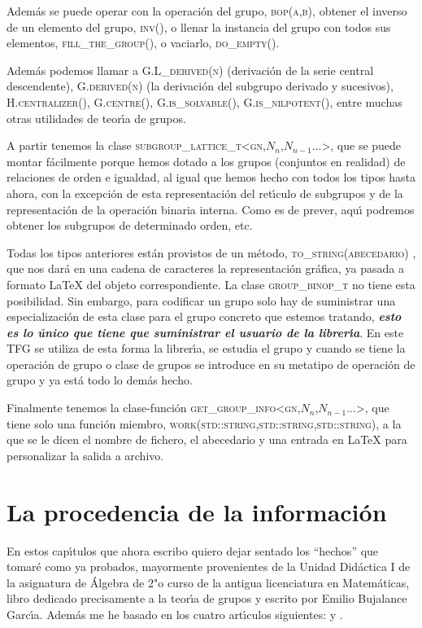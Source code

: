 \documentclass[final,12pt,a4paper,twoside,fleqn]{extbook}
\newcommand{\memph}[1]{\textbf{\emph{#1}}}
\theoremstyle{definition}
\theoremstyle{remark}
\begin{document}
Adem\'as se puede operar con la operaci\'on del grupo, \textsc{bop(a,b)}, obtener el inverso de un elemento
del grupo, \textsc{inv()}, o llenar la instancia del grupo con todos sus elementos, \textsc{fill\_the\_group()}, o vaciarlo,
\textsc{do\_empty()}.

Adem\'as podemos llamar a \textsc{G.L\_derived(n)} (derivaci\'on de la serie central descendente),
 \textsc{G.derived(n)} (la derivaci\'on del subgrupo derivado y sucesivos),
 \textsc{H.centralizer()}, \textsc{G.centre()}, \textsc{G.is\_solvable()},
\textsc{G.is\_nilpotent()}, entre muchas otras utilidades de teor{\'{\i}}a de grupos.

A partir tenemos la clase \textsc{subgroup\_lattice\_t<gn,$N_n$,$N_{n-1}$...>}, que se puede montar f\'acilmente
porque hemos dotado a los grupos (conjuntos en realidad) de relaciones de orden e igualdad, al igual que hemos
hecho con todos los tipos
hasta ahora, con la excepci\'on de esta representaci\'on del ret{\'{\i}}culo de subgrupos y de la representaci\'on de la
operaci\'on binaria interna. Como es de prever, aqu{\'{\i}} podremos obtener los subgrupos de determinado orden, etc.

Todas los tipos anteriores est\'an provistos de un m\'etodo, \textsc{to\_string(abecedario) }, que nos dar\'a en una cadena
de caracteres la representaci\'on gr\'afica, ya pasada a formato LaTeX del objeto correspondiente. La clase
\textsc{group\_binop\_t} no tiene esta posibilidad. Sin embargo, para codificar un grupo solo hay de
suministrar una especializaci\'on de esta clase para el grupo concreto que estemos tratando,
\memph{esto es lo \'unico que tiene que suministrar el usuario de la librer{\'{\i}}a}. En este TFG se utiliza de esta
forma la librer{\'{\i}}a, se estudia el grupo y cuando se tiene la operaci\'on de grupo o clase de grupos se introduce en su
metatipo de operaci\'on de grupo y ya est\'a todo lo dem\'as hecho.

Finalmente tenemos la clase-funci\'on \textsc{get\_group\_info<gn,$N_n$,$N_{n-1}$...>},
que tiene solo una funci\'on miembro,
\textsc{work(std::string,std::string,std::string)}, a la que se le dicen el nombre de fichero, el abecedario y una entrada
en LaTeX para personalizar la salida a archivo.

\section{La procedencia de la informaci\'on}

En estos cap{\'{\i}}tulos que ahora escribo quiero dejar sentado los ``hechos''
que tomar\'e como ya probados, mayormente provenientes de la Unidad
Did\'actica I de la asignatura de \'Algebra de 2"o curso de la antigua
licenciatura en Matem\'aticas, libro dedicado precisamente a la teor{\'{\i}}a
de grupos y escrito por Emilio Bujalance Garc{\'{\i}}a\cite{EBujalance1989}.
Adem\'as me he basado en los cuatro art{\'{\i}}culos siguientes: \cite{Wilde2005} y
\cite{Clausen2012}.
\end{document}
